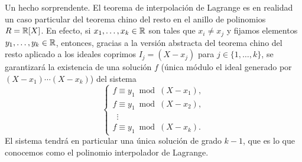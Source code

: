 Un hecho sorprendente. El teorema de interpolación de Lagrange es en realidad un caso particular del teorema chino del resto en el anillo de polinomios $R=\mathbb{R}[X]$. En efecto,
si $x_1,\dots,x_k\in\mathbb{R}$ son tales que $x_i\ne x_j$ y fijamos elementos $y_1,\dots,y_k\in\mathbb{R}$, entonces, gracias a la versión abstracta del teorema chino del resto aplicado
a los ideales coprimos $I_j=(X-x_j)$ para $j\in\{1,\dots,k\}$, se garantizará la existencia de una solución $f$ 
(única módulo el ideal generado por $(X-x_1)\cdots (X-x_k)$) del sistema
\[
\begin{cases}
f\equiv y_1\bmod (X-x_1),\\
f\equiv y_1\bmod (X-x_2),\\
\phantom{f}\vdots\\
f\equiv y_1\bmod (X-x_k).	
\end{cases}
\]
El sistema tendrá en particular una única solución de grado $k-1$, 
que es lo que conocemos como el polinomio interpolador de Lagrange.

